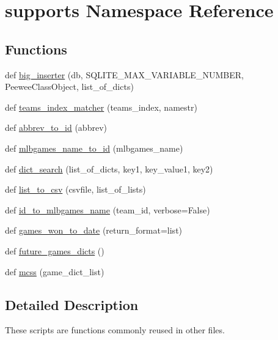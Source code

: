 \hypertarget{namespacesupports}{}\section{supports Namespace Reference}
\label{namespacesupports}
\subsection*{Functions}
\begin{DoxyCompactItemize}
\item 
def \hyperlink{namespacesupports_aa095a5513117cbd542b488aee6531893}{big\+\_\+inserter} (db, S\+Q\+L\+I\+T\+E\+\_\+\+M\+A\+X\+\_\+\+V\+A\+R\+I\+A\+B\+L\+E\+\_\+\+N\+U\+M\+B\+ER, Peewee\+Class\+Object, list\+\_\+of\+\_\+dicts)
\item 
def \hyperlink{namespacesupports_ac370dbba838cbcf3b3408d56b01eab71}{teams\+\_\+index\+\_\+matcher} (teams\+\_\+index, namestr)
\item 
def \hyperlink{namespacesupports_aa84c6c2298ff71a497f01e065c9b344c}{abbrev\+\_\+to\+\_\+id} (abbrev)
\item 
def \hyperlink{namespacesupports_a2eac8ddd50e17e273cdeb1d369fe502e}{mlbgames\+\_\+name\+\_\+to\+\_\+id} (mlbgames\+\_\+name)
\item 
def \hyperlink{namespacesupports_aa07d365f7b70a1fb04093bf4bfe6d729}{dict\+\_\+search} (list\+\_\+of\+\_\+dicts, key1, key\+\_\+value1, key2)
\item 
def \hyperlink{namespacesupports_a62a305796d14de42470631a7b5c067ae}{list\+\_\+to\+\_\+csv} (csvfile, list\+\_\+of\+\_\+lists)
\item 
def \hyperlink{namespacesupports_a984731467b1410590f04fb486cc45f87}{id\+\_\+to\+\_\+mlbgames\+\_\+name} (team\+\_\+id, verbose=False)
\item 
def \hyperlink{namespacesupports_acf30caa5d5216e7e1c628a20c73e0c1e}{games\+\_\+won\+\_\+to\+\_\+date} (return\+\_\+format=\textquotesingle{}list\textquotesingle{})
\item 
def \hyperlink{namespacesupports_a7c4adbb3535c6213a7aece479d707f30}{future\+\_\+games\+\_\+dicts} ()
\item 
def \hyperlink{namespacesupports_a2c8d4ba67a6ee15cbc81b311e2bcb7ac}{mcss} (game\+\_\+dict\+\_\+list)
\end{DoxyCompactItemize}


\subsection{Detailed Description}
\begin{DoxyVerb}These scripts are functions commonly reused in other files.
\end{DoxyVerb}
 

